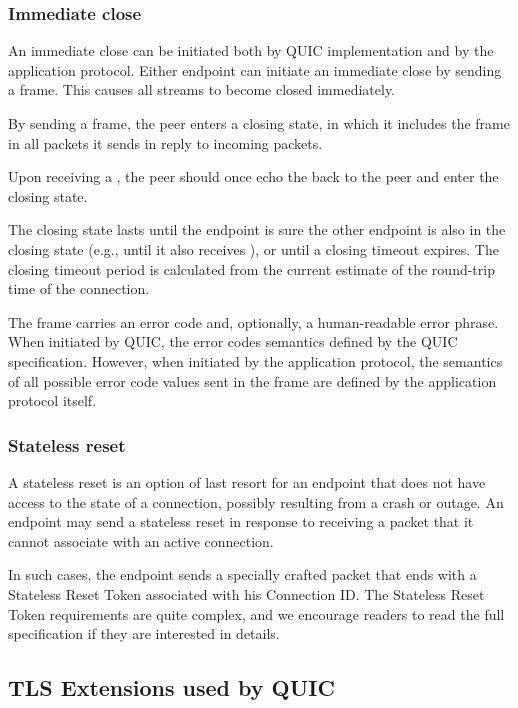 \subsubsection{Immediate close}

An immediate close can be initiated both by QUIC implementation and by the application protocol.
Either endpoint can initiate an immediate close by sending a \CONNECTIONCLOSE{} frame. This causes
all streams to become closed immediately.

By sending a \CONNECTIONCLOSE{} frame, the peer enters a closing state, in which it includes the
\CONNECTIONCLOSE{} frame in all packets it sends in reply to incoming packets.

Upon receiving a \CONNECTIONCLOSE{}, the peer should once echo the \CONNECTIONCLOSE{} back to the
peer and enter the closing state.

The closing state lasts until the endpoint is sure the other endpoint is also in the closing state
(e.g., until it also receives \CONNECTIONCLOSE{}), or until a closing timeout expires. The closing
timeout period is calculated from the current estimate of the round-trip time of the connection.

The \CONNECTIONCLOSE{} frame carries an error code and, optionally, a human-readable error phrase.
When initiated by QUIC, the error codes semantics defined by the QUIC specification. However, when
initiated by the application protocol, the semantics of all possible error code values sent in the
frame are defined by the application protocol itself.

\subsubsection{Stateless reset}

A stateless reset is an option of last resort for an endpoint that does not have access to the state
of a connection, possibly resulting from a crash or outage. An endpoint may send a stateless reset
in response to receiving a packet that it cannot associate with an active connection.

In such cases, the endpoint sends a specially crafted packet that ends with a Stateless Reset Token
associated with his Connection ID\@. The Stateless Reset Token requirements are quite complex, and
we encourage readers to read the full specification if they are interested in details. 

\subsection{TLS Extensions used by QUIC}

